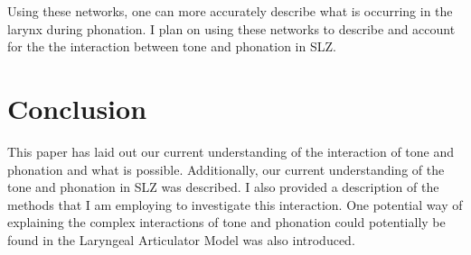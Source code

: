 \documentclass[12pt, letterpaper]{article}
\begin{document}
Using these networks, one can more accurately describe what is occurring in the larynx during phonation. I plan on using these networks to describe and account for the the interaction between tone and phonation in SLZ. 

\section{Conclusion} \label{sec:Conclusion}

This paper has laid out our current understanding of the interaction of tone and phonation and what is possible. Additionally, our current understanding of the tone and phonation in SLZ was described. I also provided a description of the methods that I am employing to investigate this interaction. One potential way of explaining the complex interactions of tone and phonation could potentially be found in the Laryngeal Articulator Model was also introduced. 


\printbibliography[heading=bibintoc]
\end{document}
